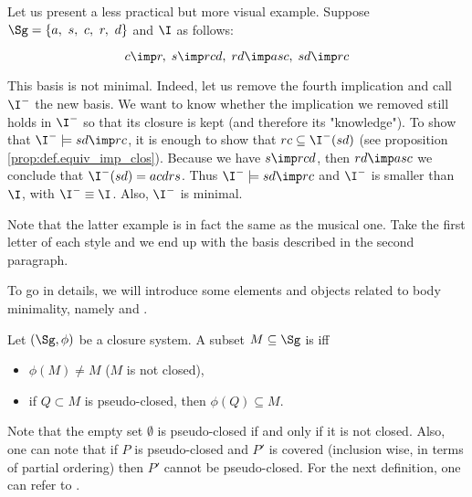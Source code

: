 \vspace{0.5em}

Let us present a less practical but more visual example. Suppose $\Sg = \{ a, 
\  s,\  c, \  r, \  d\}$
and $\I$ as follows:

	\[ c \imp r, \; s \imp rcd, \; rd \imp asc, \; sd \imp rc \]

\noindent This basis is not minimal. Indeed, let us remove the fourth 
implication and call $\I^{-}$ the new basis. We want to know whether the 
implication we removed still holds in $\I^{-}$ so that its closure is kept (and
therefore its "knowledge"). To show that $\I^{-} \models sd \imp rc$, it is
enough to show that $rc \subseteq \I^{-}(sd)$ (see proposition 
\ref{prop:def.equiv_imp_clos}). Because we have $s \imp rcd$, then $rd \imp 
asc$ we conclude that $\I^{-}(sd) = acdrs$. Thus $\I^{-} \models sd \imp rc$ 
and $\I^{-}$ is smaller than $\I$, with $\I^{-} \equiv \I$. Also, $\I^{-}$ is 
minimal.

\vspace{0.5em}

Note that the latter example is in fact the same as the musical one. Take the 
first letter of each style and we end up with the basis described in the second
paragraph.


\vspace{1.2em}

To go in details, we will introduce some elements and objects related to body 
minimality, namely  and .

\begin{definition} Let $(\Sg, \phi)$ be a closure 
	system. A subset $M \subseteq \Sg$ is  iff 
	\begin{itemize}
		\item $\phi(M) \neq M$ ($M$ is not closed),
		\item if $Q \subset M$ is pseudo-closed, then $\phi(Q) \subseteq M$.
	\end{itemize}
	
\end{definition}

Note that the empty set $\emptyset$ is pseudo-closed if and only if it is not 
closed. Also, one can note that if $P$ is pseudo-closed and $P'$ is covered
(inclusion wise, in terms of partial ordering) then $P'$ cannot be 
pseudo-closed. For the next definition, one can refer to 
\cite{b._ganter_conceptual_2016, guigues_familles_1986}.

